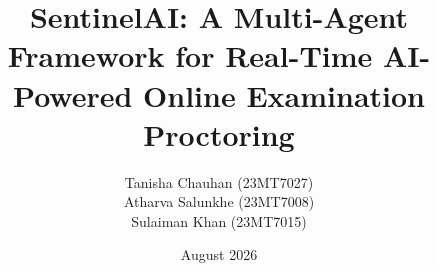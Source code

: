 \clearpage%

\title{\LARGE SentinelAI: A Multi-Agent Framework for Real-Time AI-Powered Online Examination Proctoring}
\author{Tanisha Chauhan (23MT7027) \\{} Atharva Salunkhe (23MT7008) \\{} Sulaiman Khan (23MT7015)}
\date{August 2026}



\maketitle

